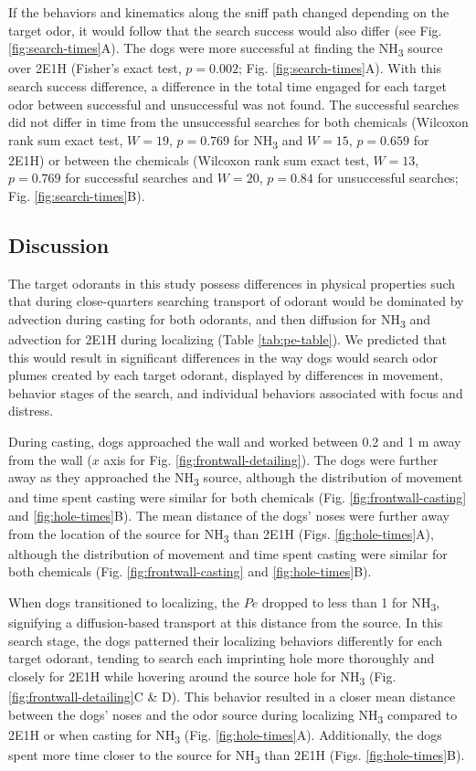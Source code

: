 \documentclass[
]{article}
\begin{document}
If the behaviors and kinematics along the sniff path changed depending on the target odor, it would follow that the search success would also differ (see Fig. \ref{fig:search-times}A). The dogs were more successful at finding the NH\textsubscript{3} source over 2E1H (Fisher's exact test, \(p = 0.002\); Fig. \ref{fig:search-times}A). With this search success difference, a difference in the total time engaged for each target odor between successful and unsuccessful was not found. The successful searches did not differ in time from the unsuccessful searches for both chemicals (Wilcoxon rank sum exact test, \(W = 19\), \(p = 0.769\) for NH\textsubscript{3} and \(W = 15\), \(p = 0.659\) for 2E1H) or between the chemicals (Wilcoxon rank sum exact test, \(W = 13\), \(p = 0.769\) for successful searches and \(W = 20\), \(p = 0.84\) for unsuccessful searches; Fig. \ref{fig:search-times}B).

\hypertarget{discussion}{%
\subsection{Discussion}\label{discussion}}

The target odorants in this study possess differences in physical properties such that during close-quarters searching transport of odorant would be dominated by advection during casting for both odorants, and then diffusion for NH\textsubscript{3} and advection for 2E1H during localizing (Table \ref{tab:pe-table}). We predicted that this would result in significant differences in the way dogs would search odor plumes created by each target odorant, displayed by differences in movement, behavior stages of the search, and individual behaviors associated with focus and distress.

During casting, dogs approached the wall and worked between 0.2 and 1 m away from the wall (\(x\) axis for Fig. \ref{fig:frontwall-detailing}). The dogs were further away as they approached the NH\textsubscript{3} source, although the distribution of movement and time spent casting were similar for both chemicals (Fig. \ref{fig:frontwall-casting} and \ref{fig:hole-times}B). The mean distance of the dogs' noses were further away from the location of the source for NH\textsubscript{3} than 2E1H (Figs. \ref{fig:hole-times}A), although the distribution of movement and time spent casting were similar for both chemicals (Fig. \ref{fig:frontwall-casting} and \ref{fig:hole-times}B).

When dogs transitioned to localizing, the \(Pe\) dropped to less than 1 for NH\textsubscript{3}, signifying a diffusion-based transport at this distance from the source. In this search stage, the dogs patterned their localizing behaviors differently for each target odorant, tending to search each imprinting hole more thoroughly and closely for 2E1H while hovering around the source hole for NH\textsubscript{3} (Fig. \ref{fig:frontwall-detailing}C \& D). This behavior resulted in a closer mean distance between the dogs' noses and the odor source during localizing NH\textsubscript{3} compared to 2E1H or when casting for NH\textsubscript{3} (Fig. \ref{fig:hole-times}A). Additionally, the dogs spent more time closer to the source for NH\textsubscript{3} than 2E1H (Figs. \ref{fig:hole-times}B).
\end{document}

